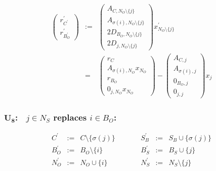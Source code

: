 \documentclass[a4paper]{article}
\begin{document}
\begin{eqnarray}
\left(
\begin{array}{c}
r_{C^{\prime}}^{\prime} \\
\hline
r_{B_{O}^{\prime}}^{\prime}
\end{array}
\right)
&:=&
\left(
\begin{array}{c}
A_{C, N_{O} \setminus \{j\}} \\
\hline
A_{\sigma(i), N_{O} \setminus \{j\}} \\
\hline
2D_{B_{O}, N_{O} \setminus \{j\}} \\
\hline
2D_{j, N_{O} \setminus \{j\}}
\end{array}
\right)
x_{N_{O} \setminus \{j\}}^{\prime} \\
&=&
\left(
\begin{array}{c}
r_{C} \\
\hline
A_{\sigma(i), N_{O}}x_{N_{O}} \\
\hline
r_{B_{O}} \\
\hline
0_{j, N_{O}}x_{N_{O}}
\end{array}
\right)
-
\left(
\begin{array}{c}
A_{C, j} \\
\hline
A_{\sigma(i), j} \\
\hline
0_{B_{O}, j} \\
\hline
0_{j,j}
\end{array}
\right)
x_{j}
\end{eqnarray}

\subsubsection{$\mathbf{U_{8}}$:$\quad j \in N_{S}$ replaces $i \in B_{O}$:}
\begin{equation}
\label{update:s_rep_o}
\begin{array}{ccccccc}
C^{\prime}      &:=&  C \setminus \{\sigma(j)\}
&\quad\quad&
S_{B}^{\prime}  &:=&  S_{B} \cup \{\sigma(j)\} \\
B_{O}^{\prime}  &:=&  B_{O} \setminus \{i\}
&\quad\quad&
B_{S}^{\prime}  &:=&  B_{S} \cup \{j\}  \\
N_{O}^{\prime}  &:=&  N_{O} \cup \{i\}
&\quad\quad&
N_{S}^{\prime}  &:=&  N_{S} \setminus \{j\} 
\end{array}
\end{equation}
\end{document}
